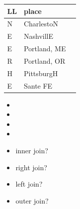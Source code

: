\documentclass[xcolor={dvipsnames}]{beamer}
\begin{document}
{\begin{columns}
\begin{column}{.3\textwidth}
 \normalsize
  
  \vspace{2.5em}



    
\end{column}   
\begin{column}{.35\textwidth}
   \scriptsize
   \begin{tabular}{|l|l|l|}
   \hline 
LL & place \\  \hline
N & CharlestoN  \\
E & NashvillE \\
E & Portland, ME \\
R & Portland, OR \\
H & PittsburgH \\ 
E & Sante FE \\ \hline
   \end{tabular}

\vspace{.4em}

\normalsize
\begin{itemize}
\item[]
\item[]
\item[]
\item[]
\item<2-> inner join?
\item<2-> right join?
\item<2-> left join?
\item<2-> outer join?
\end{itemize}   

      
   \end{column}   
   \end{columns}
  




   
}
\end{document}
